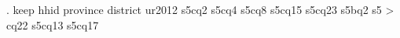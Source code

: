 . keep hhid province district ur2012 s5cq2 s5cq4 s5cq8 s5cq15 s5cq23 s5bq2 s5
> cq22 s5cq13 s5cq17 
{\smallskip}

